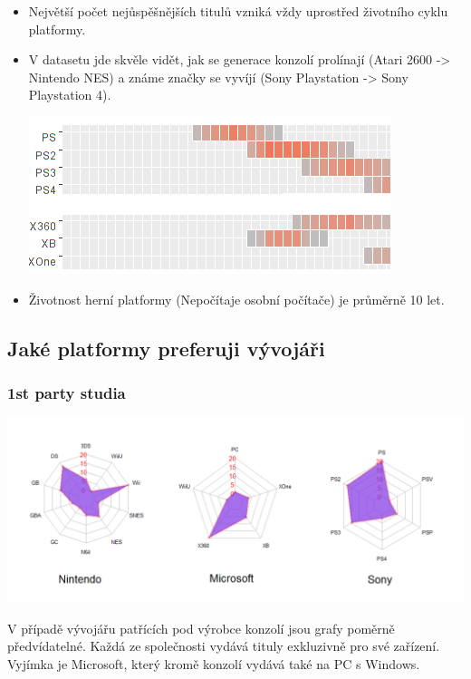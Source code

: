 \documentclass[a4paper,11pt]{article}
\begin{document}
\begin{itemize}
\item Největší počet nejůspěšnějších titulů vzniká vždy uprostřed životního cyklu platformy.

\item V datasetu jde skvěle vidět, jak se generace konzolí prolínají (Atari 2600 -> Nintendo NES) a známe značky se vyvíjí (Sony Playstation -> Sony Playstation 4).

\begin{center}
\includegraphics[scale=2.0]{lifecycle}
\end{center}

\item Životnost herní platformy (Nepočítaje osobní počítače) je průměrně 10 let.

\end{itemize}


\newpage

\subsection{Jaké platformy preferuji vývojáři}

\subsubsection{1st party studia}
\includegraphics[scale=0.5]{1stparty}

V případě vývojářu patřících pod výrobce konzolí jsou grafy poměrně předvídatelné. Každá ze společnosti vydává tituly exkluzivně pro své zařízení. Vyjímka je Microsoft, který kromě konzolí vydává také na PC s Windows.
\end{document}
